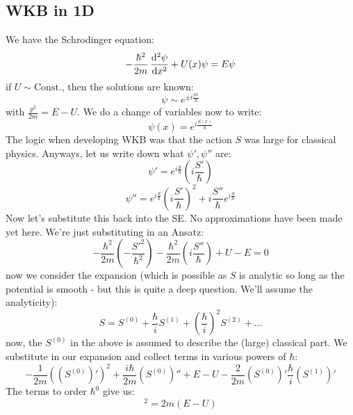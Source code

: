 \subsection{WKB in 1D}
We have the Schrodinger equation:
\begin{equation}
    -\frac{\hbar^2}{2m}\dod[2]{\psi}{x} + U(x)\psi = E\psi
\end{equation}
if $U \sim \text{Const.}$, then the solutions are known:
\begin{equation}
    \psi \sim e^{\pm i\frac{px}{\hbar}}
\end{equation}
with $\frac{p^2}{2m} = E - U$. We do a change of variables now to write:
\begin{equation}
    \psi(x) = e^{i\frac{S(x)}{\hbar}}
\end{equation}
The logic when developing WKB was that the action $S$ was large for classical physics. Anyways, let us write down what $\psi', \psi''$ are:
\begin{equation}
    \psi' = e^{i\frac{S}{\hbar}}\left(i\frac{S'}{\hbar}\right)
\end{equation}
\begin{equation}
    \psi'' = e^{i\frac{S}{\hbar}}\left(i\frac{S'}{\hbar}\right)^2 + i\frac{S''}{\hbar}e^{i\frac{S}{\hbar}}
\end{equation}
Now let's substitute this back into the SE. No approximations have been made yet here. We're just substituting in an Ansatz:
\begin{equation}
    -\frac{\hbar^2}{2m}\left(-\frac{S'^2}{\hbar^2}\right) - \frac{\hbar^2}{2m}\left(i\frac{S''}{\hbar}\right) + U - E = 0
\end{equation}
now we consider the expansion (which is possible as $S$ is analytic so long as the potential is smooth - but this is quite a deep question. We'll assume the analyticity):
\begin{equation}
    S = S^{(0)} + \frac{\hbar}{i}S^{(1)} + \left(\frac{\hbar}{i}\right)^2S^{(2)} + \ldots
\end{equation}
now, the $S^{(0)}$ in the above is assumed to describe the (large) classical part. We substitute in our expansion and collect terms in various powers of $\hbar$:
\begin{equation}
    -\frac{1}{2m}\left((S^{(0)})'\right)^2 + \frac{i\hbar}{2m}(S^{(0)})'' + E - U - \frac{2}{2m}(S^{(0)})' \frac{\hbar}{i}(S^{(1)})'
\end{equation}
The terms to order $\hbar^0$ give us:
\begin{equation}
    [(S^{(0)})']^2 = 2m(E - U)
\end{equation}
